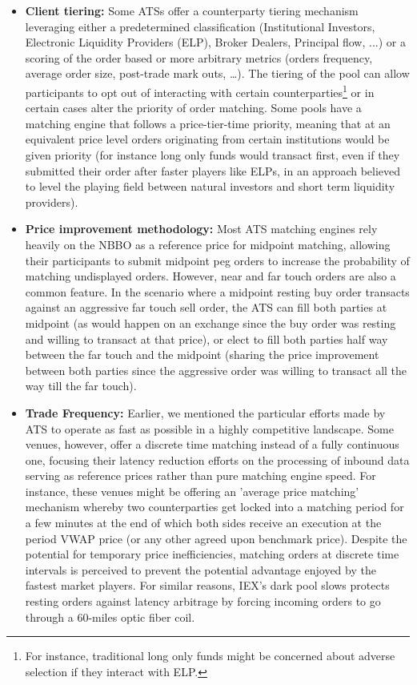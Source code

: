 \begin{itemize}
\item{\textbf{Client tiering:}} Some ATSs offer a counterparty tiering mechanism leveraging either a predetermined classification (Institutional Investors, Electronic Liquidity Providers (ELP), Broker Dealers, Principal flow, ...) or a scoring of the order based or more arbitrary metrics (orders frequency, average order size, post-trade mark outs, \dots). The tiering of the pool can allow participants to opt out of interacting with certain counterparties\footnote{For instance, traditional long only funds might be concerned about adverse selection if they interact with ELP.} or in certain cases alter the priority of order matching. Some pools have a matching engine that follows a price-tier-time priority, meaning that at an equivalent price level orders originating from certain institutions would be given priority (for instance long only funds would transact first, even if they submitted their order after faster players like ELPs, in an approach believed to level the playing field between natural investors and short term liquidity providers). 

\item{\textbf{Price improvement methodology:}} Most ATS matching engines rely heavily on the NBBO as a reference price for midpoint matching, allowing their participants to submit midpoint peg orders to increase the probability of matching undisplayed orders. However, near and far touch orders are also a common feature. In the scenario where a midpoint resting buy order transacts against an aggressive far touch sell order, the ATS can fill both parties at midpoint (as would happen on an exchange since the buy order was resting and willing to transact at that price), or elect to fill both parties half way between the far touch and the midpoint (sharing the price improvement between both parties since the aggressive order was willing to transact all the way till the far touch). 

\item{\textbf{Trade Frequency:}} Earlier, we mentioned the particular efforts made by ATS to operate as fast as possible in a highly competitive landscape. Some venues, however, offer a discrete time matching instead of a fully continuous one, focusing their latency reduction efforts on the processing of inbound data serving as reference prices rather than pure matching engine speed. For instance, these venues might be offering an 'average price matching' mechanism whereby two counterparties get locked into a matching period for a few minutes at the end of which both sides receive an execution at the period VWAP price (or any other agreed upon benchmark price). Despite the potential for temporary price inefficiencies, matching orders at discrete time intervals is perceived to prevent the potential advantage enjoyed by the fastest market players. For similar reasons, IEX's dark pool slows protects resting orders against latency arbitrage by forcing incoming orders to go through a 60-miles optic fiber coil.


\end{itemize}
